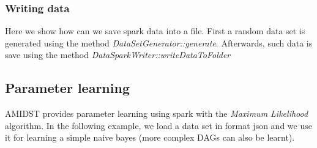 \documentclass[10pt,a4paper]{article}
\begin{document}


\subsubsection{Writing data}\label{sec:sparklink:io:write}

Here we show how can we save spark data into a file. First a random data set is generated using the method \textit{DataSetGenerator::generate}. Afterwards, such data is save using the method \textit{DataSparkWriter::writeDataToFolder}


\subsection{Parameter learning}\label{sec:sparklink:learning}

AMIDST provides parameter learning using spark with the \textit{Maximum Likelihood} algorithm. In the following example, we load a data set in format json and we use it for learning a simple naive bayes (more complex DAGs can also be learnt).

\end{document}
